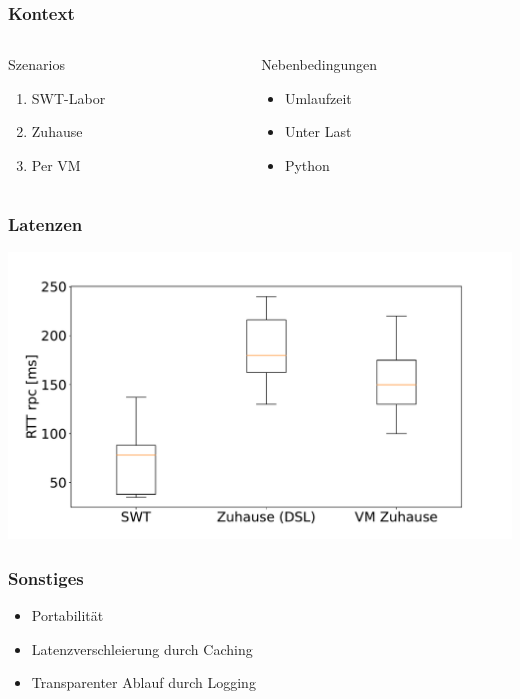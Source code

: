 \documentclass{beamer}
\begin{document}
\begin{frame}
    \frametitle{Kontext}

    \begin{columns}
        \begin{column}{0.5\textwidth}
            Szenarios
            \begin{enumerate}
                \item SWT-Labor
                \item Zuhause
                \item Per VM
            \end{enumerate}
        \end{column}
        \begin{column}{0.5\textwidth}
            Nebenbedingungen
            \begin{itemize}
                \item Umlaufzeit
                \item Unter Last
                \item Python
            \end{itemize}
        
        \end{column}
    \end{columns}
\end{frame}
\begin{frame}
    \frametitle[]{Latenzen}
    \includegraphics[width=\textwidth]{images/latencies.pdf}
\end{frame}


\begin{frame}
    \frametitle[]{Sonstiges}
    \begin{itemize}
        \item Portabilität
        \item Latenzverschleierung durch Caching
        \item Transparenter Ablauf durch Logging
    \end{itemize}
\end{frame}
\end{document}
